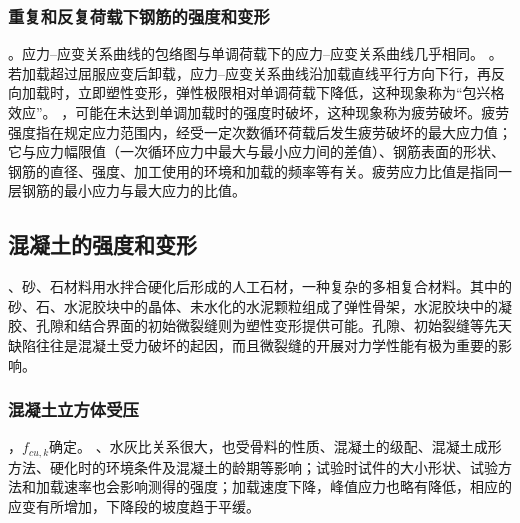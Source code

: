 \documentclass{article}
\newcommand{\gb}{《混凝土结构设计规范》（GB 50010）}
\begin{document}
\subsubsection{重复和反复荷载下钢筋的强度和变形}
。应力--应变关系曲线的包络图与单调荷载下的应力--应变关系曲线几乎相同。
。若加载超过屈服应变后卸载，应力--应变关系曲线沿加载直线平行方向下行，再反向加载时，立即塑性变形，弹性极限相对单调荷载下降低，这种现象称为“包兴格效应”。
，可能在未达到单调加载时的强度时破坏，这种现象称为疲劳破坏。疲劳强度指在规定应力范围内，经受一定次数循环荷载后发生疲劳破坏的最大应力值；它与应力幅限值（一次循环应力中最大与最小应力间的差值）、钢筋表面的形状、钢筋的直径、强度、加工使用的环境和加载的频率等有关。疲劳应力比值是指同一层钢筋的最小应力与最大应力的比值。
\subsection{混凝土的强度和变形}
、砂、石材料用水拌合硬化后形成的人工石材，一种复杂的多相复合材料。其中的砂、石、水泥胶块中的晶体、未水化的水泥颗粒组成了弹性骨架，水泥胶块中的凝胶、孔隙和结合界面的初始微裂缝则为塑性变形提供可能。孔隙、初始裂缝等先天缺陷往往是混凝土受力破坏的起因，而且微裂缝的开展对力学性能有极为重要的影响。
\subsubsection{混凝土立方体受压}
，$f_{cu,k}$确定。
、水灰比关系很大，也受骨料的性质、混凝土的级配、混凝土成形方法、硬化时的环境条件及混凝土的龄期等影响；试验时试件的大小形状、试验方法和加载速率也会影响测得的强度；加载速度下降，峰值应力也略有降低，相应的应变有所增加，下降段的坡度趋于平缓。
\end{document}
